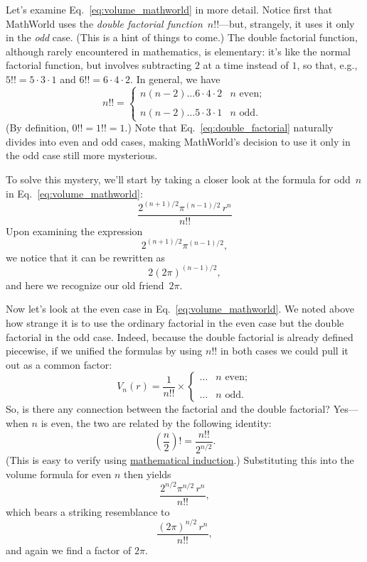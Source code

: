 Let's examine Eq.~\eqref{eq:volume_mathworld} in more detail. Notice first that MathWorld uses the \emph{double factorial function}~$n!!$---but, strangely, it uses it only in the \emph{odd} case. (This is a hint of things to come.) The double factorial function, although rarely encountered in mathematics, is elementary: it's like the normal factorial function, but involves subtracting $2$ at a time instead of $1$, so that, e.g., $5!! = 5 \cdot 3 \cdot 1$ and $6!! = 6 \cdot 4 \cdot 2$. In general, we have
\begin{equation}
\label{eq:double_factorial}
n!! = \begin{cases}
n(n-2)\ldots6\cdot4\cdot2 & n \text{ even}; \\ \\
n(n-2)\ldots5\cdot3\cdot1 & n \text{ odd}.
\end{cases}
\end{equation}
(By definition, $0!! = 1!! = 1$.) Note that Eq.~\eqref{eq:double_factorial} naturally divides into even and odd cases, making MathWorld's decision to use it only in the odd case still more mysterious.

To solve this mystery, we'll start by taking a closer look at the formula for odd~$n$ in Eq.~\eqref{eq:volume_mathworld}:
\[ \frac{2^{(n+1)/2}\pi^{(n-1)/2}\,r^n}{n!!} \]
Upon examining the expression
\[ 2^{(n+1)/2}\pi^{(n-1)/2}, \]
we notice that it can be rewritten as
\[ 2(2\pi)^{(n-1)/2}, \]
and here we recognize our old friend~$2\pi$.

Now let's look at the even case in Eq.~\eqref{eq:volume_mathworld}. We noted above how strange it is to use the ordinary factorial in the even case but the double factorial in the odd case. Indeed, because the double factorial is already defined piecewise, if we unified the formulas by using $n!!$ in both cases we could pull it out as a common factor:
\[
V_n(r) = \frac{1}{n!!}\times \begin{cases}
\ldots & n \text{ even}; \\ \\
 \ldots & n \text{ odd}.
 \end{cases}
\]
So, is there any connection between the factorial and the double factorial? Yes---when $n$ is even, the two are related by the following identity:
\[ \left(\frac{n}{2}\right)! = \frac{n!!}{2^{n/2}}. \]
(This is easy to verify using \href{https://en.wikipedia.org/wiki/Mathematical_induction}{mathematical induction}.) Substituting this into the volume formula for even $n$ then yields
\[ \frac{2^{n/2}\pi^{n/2}\,r^n}{n!!}, \]
which bears a striking resemblance to
\[ \frac{(2\pi)^{n/2}\,r^n}{n!!}, \]
and again we find a factor of $2\pi$.

